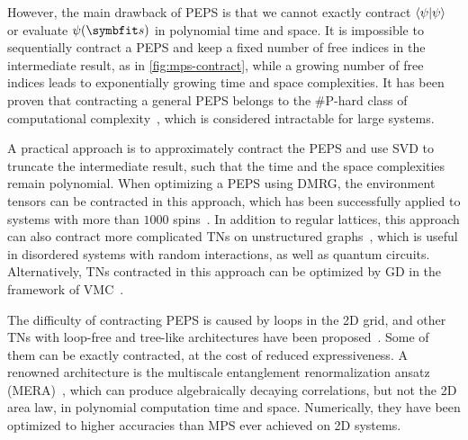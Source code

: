 However, the main drawback of PEPS is that we cannot exactly contract $\ip{\psi}$ or evaluate $\psi(\vs)$ in polynomial time and space. It is impossible to sequentially contract a PEPS and keep a fixed number of free indices in the intermediate result, as in \cref{fig:mps-contract}, while a growing number of free indices leads to exponentially growing time and space complexities. It has been proven that contracting a general PEPS belongs to the \#P-hard class of computational complexity~\cite{schuch2007computational}, which is considered intractable for large systems.

A practical approach is to approximately contract the PEPS and use SVD to truncate the intermediate result, such that the time and the space complexities remain polynomial. When optimizing a PEPS using DMRG, the environment tensors can be contracted in this approach, which has been successfully applied to systems with more than $1000$ spins~\cite{stoudenmire2012annual, lubasch2014algorithms, vanderstraeten2022variational}. In addition to regular lattices, this approach can also contract more complicated TNs on unstructured graphs~\cite{jermyn2020automatic, pan2020contracting, sahu2022efficient}, which is useful in disordered systems with random interactions, as well as quantum circuits. Alternatively, TNs contracted in this approach can be optimized by GD in the framework of VMC~\cite{schuch2008simulation, mezzacapo2009ground, vanderstraeten2016gradient}.

The difficulty of contracting PEPS is caused by loops in the 2D grid, and other TNs with loop-free and tree-like architectures have been proposed~\cite{shi2006classical, silvi2010homogeneous, cheng2019tree, felser2021efficient}. Some of them can be exactly contracted, at the cost of reduced expressiveness. A renowned architecture is the multiscale entanglement renormalization ansatz (MERA)~\cite{vidal2007entanglement, qian2022tree}, which can produce algebraically decaying correlations, but not the 2D area law, in polynomial computation time and space. Numerically, they have been optimized to higher accuracies than MPS ever achieved on 2D systems.
